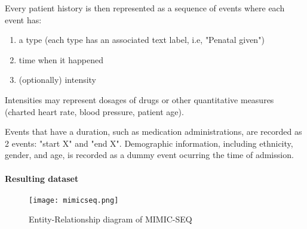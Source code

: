 Every patient history is then represented as a sequence of events where each event has:
\begin{enumerate}
    \item a type (each type has an associated text label, i.e, "Penatal given")
    \item time when it happened
    \item (optionally) intensity
\end{enumerate}

Intensities may represent dosages of drugs or other quantitative measures (charted heart rate, blood pressure, patient age).

Events that have a duration, such as medication administrations, are recorded as 2 events: "start X" and "end X". 
Demographic information, including ethnicity, gender, and age, is recorded as a dummy event ocurring the time of admission.

\paragraph{Resulting dataset}

\begin{figure}
    \centering
    \texttt{[image: mimicseq.png]}
    \caption{Entity-Relationship diagram of MIMIC-SEQ}
    \label{fig:enter-label}
\end{figure}

